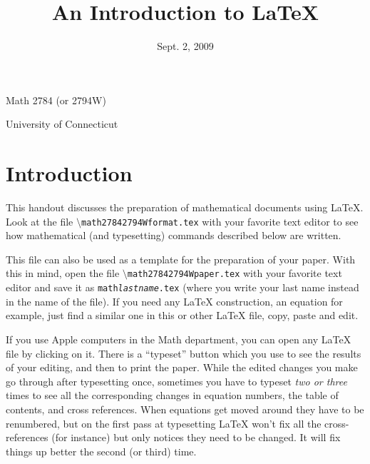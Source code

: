 \documentclass[12pt,letterpaper]{amsart}
\newcommand{\latex}{\LaTeX}
\newcommand{\sm}{\setminus}
\newcommand{\pln}[1]{$\sm${\tt #1}}
\theoremstyle{plain}
\theoremstyle{definition}
\numberwithin{equation}{section}
\begin{document}
\begin{titlepage}
\title{An Introduction to \latex}
\author{}
\date{Sept. 2, 2009}
\maketitle

\centerline{\Large Math 2784 (or 2794W)}

\hfill

\centerline{\Large University of Connecticut}
\thispagestyle{empty}
\end{titlepage}
\pagebreak



\thispagestyle{empty}
\tableofcontents


\vfill



\pagebreak
 


\section{Introduction}\label{intro}

This handout discusses the preparation of 
mathematical documents using \latex.  
Look at the file \pln{math27842794Wformat.tex} with your 
favorite text editor to see how mathematical (and typesetting) commands 
described below are written. 

This file can also be used as a template for the preparation of your paper. 
With this in mind, open the file \pln{math27842794Wpaper.tex} with your 
favorite text editor  and save it as 
{\tt math{\it lastname}.tex} (where you write your last name instead in 
the name of the file). 
If you need any \latex{} construction, an equation for example, 
just find a similar one in this or other \latex{} file, copy, paste and edit. 

If you use Apple computers in the Math department, you can open any 
\latex{} file by clicking on it. There is a ``typeset'' button which you use 
to see the results of your editing, and then to print the paper.
While the edited changes you make go through after typesetting once, 
sometimes you have to typeset {\it two or three} times to see 
all the corresponding changes in equation numbers, the table of contents, and
cross references.  When equations get moved around they have to be renumbered, 
but on the first 
pass at typesetting \latex{} won't fix all the cross-references (for instance) but only notices 
they need to be changed.  It will fix things up better the second (or third) 
time.
\end{document}
